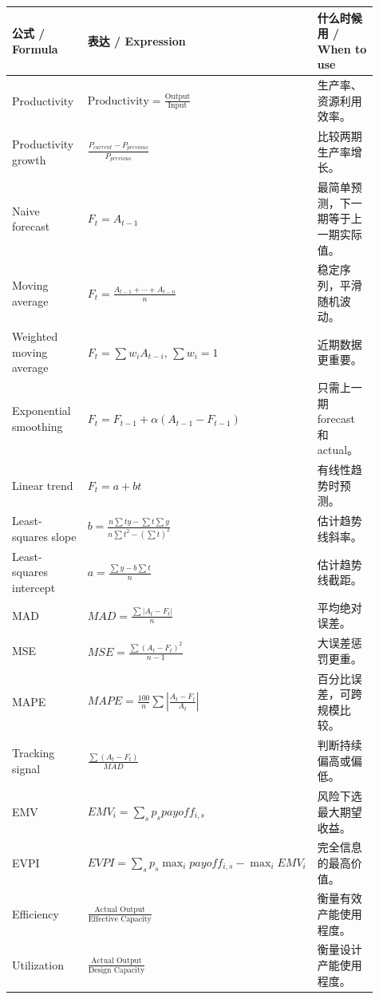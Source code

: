 \documentclass[10pt,a4paper]{ctexart}
\begin{document}
\begin{longtable}{@{}L{0.25\linewidth}L{0.36\linewidth}L{0.30\linewidth}@{}}
\toprule
\textbf{公式 / Formula} & \textbf{表达 / Expression} & \textbf{什么时候用 / When to use} \\
\midrule
Productivity & $\text{Productivity}=\frac{\text{Output}}{\text{Input}}$ & 生产率、资源利用效率。 \\
Productivity growth & $\frac{P_{current}-P_{previous}}{P_{previous}}$ & 比较两期生产率增长。 \\
Naive forecast & $F_t=A_{t-1}$ & 最简单预测，下一期等于上一期实际值。 \\
Moving average & $F_t=\frac{A_{t-1}+\cdots+A_{t-n}}{n}$ & 稳定序列，平滑随机波动。 \\
Weighted moving average & $F_t=\sum w_i A_{t-i}$, $\sum w_i=1$ & 近期数据更重要。 \\
Exponential smoothing & $F_t=F_{t-1}+\alpha(A_{t-1}-F_{t-1})$ & 只需上一期 forecast 和 actual。 \\
Linear trend & $F_t=a+bt$ & 有线性趋势时预测。 \\
Least-squares slope & $b=\frac{n\sum ty-\sum t\sum y}{n\sum t^2-(\sum t)^2}$ & 估计趋势线斜率。 \\
Least-squares intercept & $a=\frac{\sum y-b\sum t}{n}$ & 估计趋势线截距。 \\
MAD & $MAD=\frac{\sum |A_t-F_t|}{n}$ & 平均绝对误差。 \\
MSE & $MSE=\frac{\sum (A_t-F_t)^2}{n-1}$ & 大误差惩罚更重。 \\
MAPE & $MAPE=\frac{100}{n}\sum\left|\frac{A_t-F_t}{A_t}\right|$ & 百分比误差，可跨规模比较。 \\
Tracking signal & $\frac{\sum(A_t-F_t)}{MAD}$ & 判断持续偏高或偏低。 \\
EMV & $EMV_i=\sum_s p_s payoff_{i,s}$ & 风险下选最大期望收益。 \\
EVPI & $EVPI=\sum_s p_s\max_i payoff_{i,s}-\max_i EMV_i$ & 完全信息的最高价值。 \\
Efficiency & $\frac{\text{Actual Output}}{\text{Effective Capacity}}$ & 衡量有效产能使用程度。 \\
Utilization & $\frac{\text{Actual Output}}{\text{Design Capacity}}$ & 衡量设计产能使用程度。 \\

\end{longtable}
\end{document}
